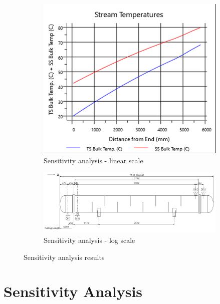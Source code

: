\begin{figure}[h!]
	\centering
	\begin{subfigure}[b]{0.7\textwidth}
		\centering
		\includegraphics[trim= 0cm 0.1cm 0.1cm 0cm, clip, width=\textwidth]{Figures/Proces_Analysis/HX.png}
		\caption{Sensitivity analysis - linear scale}
	\end{subfigure}
	\hfill
	\begin{subfigure}[b]{0.7\textwidth}
		\centering
		\includegraphics[width=\textwidth]{Figures/Proces_Analysis/HX2.jpg}
		\caption{Sensitivity analysis - log scale}
	\end{subfigure}
	\caption{Sensitivity analysis results}
	\label{fig:Ester_HX}
\end{figure}



\section{Sensitivity Analysis}

